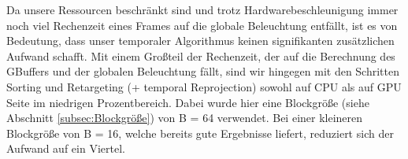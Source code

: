 Da unsere Ressourcen beschränkt sind und trotz Hardwarebeschleunigung immer noch viel Rechenzeit eines Frames auf die globale Beleuchtung entfällt,
ist es von Bedeutung, dass unser temporaler Algorithmus keinen signifikanten zusätzlichen Aufwand schafft.
Mit einem Großteil der Rechenzeit, der auf die Berechnung des GBuffers und der globalen Beleuchtung fällt, sind wir hingegen 
mit den Schritten Sorting und Retargeting (+ temporal Reprojection) sowohl auf  CPU als auf GPU Seite im niedrigen Prozentbereich.
Dabei wurde hier eine Blockgröße (siehe Abschnitt \ref{subsec:Blockgröße}) von B = 64 verwendet. Bei einer kleineren Blockgröße von B = 16, welche 
bereits gute Ergebnisse liefert, reduziert sich der Aufwand auf ein Viertel. 
\par
{}%

